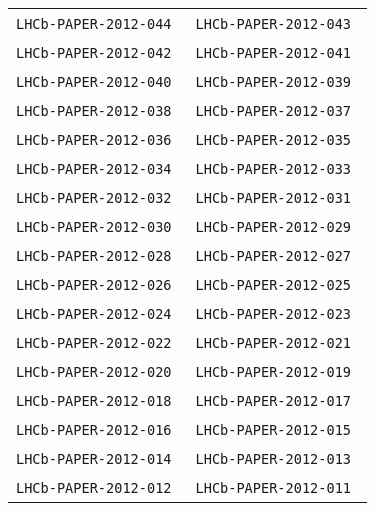 \begin{center}
\begin{longtable}{ll}
\texttt{LHCb-PAPER-2012-044}~\cite{LHCb-PAPER-2012-044} & 
\texttt{LHCb-PAPER-2012-043}~\cite{LHCb-PAPER-2012-043} \\
\texttt{LHCb-PAPER-2012-042}~\cite{LHCb-PAPER-2012-042} & 
\texttt{LHCb-PAPER-2012-041}~\cite{LHCb-PAPER-2012-041} \\
\texttt{LHCb-PAPER-2012-040}~\cite{LHCb-PAPER-2012-040} & 
\texttt{LHCb-PAPER-2012-039}~\cite{LHCb-PAPER-2012-039} \\
\texttt{LHCb-PAPER-2012-038}~\cite{LHCb-PAPER-2012-038} & 
\texttt{LHCb-PAPER-2012-037}~\cite{LHCb-PAPER-2012-037} \\
\texttt{LHCb-PAPER-2012-036}~\cite{LHCb-PAPER-2012-036} & 
\texttt{LHCb-PAPER-2012-035}~\cite{LHCb-PAPER-2012-035} \\
\texttt{LHCb-PAPER-2012-034}~\cite{LHCb-PAPER-2012-034} & 
\texttt{LHCb-PAPER-2012-033}~\cite{LHCb-PAPER-2012-033} \\
\texttt{LHCb-PAPER-2012-032}~\cite{LHCb-PAPER-2012-032} & 
\texttt{LHCb-PAPER-2012-031}~\cite{LHCb-PAPER-2012-031} \\
\texttt{LHCb-PAPER-2012-030}~\cite{LHCb-PAPER-2012-030} & 
\texttt{LHCb-PAPER-2012-029}~\cite{LHCb-PAPER-2012-029} \\
\texttt{LHCb-PAPER-2012-028}~\cite{LHCb-PAPER-2012-028} & 
\texttt{LHCb-PAPER-2012-027}~\cite{LHCb-PAPER-2012-027} \\
\texttt{LHCb-PAPER-2012-026}~\cite{LHCb-PAPER-2012-026} & 
\texttt{LHCb-PAPER-2012-025}~\cite{LHCb-PAPER-2012-025} \\
\texttt{LHCb-PAPER-2012-024}~\cite{LHCb-PAPER-2012-024} & 
\texttt{LHCb-PAPER-2012-023}~\cite{LHCb-PAPER-2012-023} \\
\texttt{LHCb-PAPER-2012-022}~\cite{LHCb-PAPER-2012-022} & 
\texttt{LHCb-PAPER-2012-021}~\cite{LHCb-PAPER-2012-021} \\
\texttt{LHCb-PAPER-2012-020}~\cite{LHCb-PAPER-2012-020} & 
\texttt{LHCb-PAPER-2012-019}~\cite{LHCb-PAPER-2012-019} \\
\texttt{LHCb-PAPER-2012-018}~\cite{LHCb-PAPER-2012-018} & 
\texttt{LHCb-PAPER-2012-017}~\cite{LHCb-PAPER-2012-017} \\
\texttt{LHCb-PAPER-2012-016}~\cite{LHCb-PAPER-2012-016} & 
\texttt{LHCb-PAPER-2012-015}~\cite{LHCb-PAPER-2012-015} \\
\texttt{LHCb-PAPER-2012-014}~\cite{LHCb-PAPER-2012-014} & 
\texttt{LHCb-PAPER-2012-013}~\cite{LHCb-PAPER-2012-013} \\
\texttt{LHCb-PAPER-2012-012}~\cite{LHCb-PAPER-2012-012} & 
\texttt{LHCb-PAPER-2012-011}~\cite{LHCb-PAPER-2012-011} \\

\end{longtable}
\end{center}
